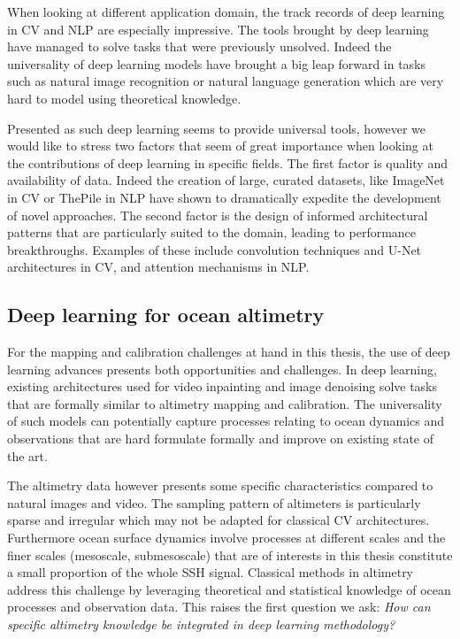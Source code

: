 \begin{bibunit}
When looking at different application domain, the track records of deep learning in CV\cite{chaiDeepLearningComputer2021} and NLP\cite{brownLanguageModelsAre2020} are especially impressive. 
The tools brought by deep learning have managed to solve tasks that were previously unsolved.
Indeed the universality of deep learning models have brought a big leap forward in tasks such as natural image recognition or natural language generation which are very hard to model using theoretical knowledge.

Presented as such deep learning seems to provide universal tools,  
however we would like to stress two factors that seem of great importance when looking at the contributions of deep learning in specific fields.
The first factor is quality and availability of data.
Indeed the creation of large, curated datasets, like ImageNet\cite{dengImageNetLargescaleHierarchical2009} in CV or ThePile\cite{gaoPile800GBDataset2020} in NLP have shown to dramatically expedite the development of novel approaches. 
The second factor is the design of informed architectural patterns that are particularly suited to the domain, leading to performance breakthroughs.
Examples of these include convolution techniques\cite{lecunHandwrittenDigitRecognition1989} and U-Net architectures\cite{ronnebergerUNetConvolutionalNetworks2015} in CV, and attention mechanisms\cite{vaswaniAttentionAllYou} in NLP.


\subsection*{Deep learning for ocean altimetry}
For the mapping and calibration challenges at hand in this thesis, the use of deep learning advances presents both opportunities and challenges.
In deep learning, existing architectures used for video inpainting\cite{kimDeepVideoInpainting} and image denoising\cite{tianDeepLearningImage2020} solve tasks that are formally similar to altimetry mapping and calibration.
The universality of such models can potentially capture processes relating to ocean dynamics and observations that are hard formulate formally and improve on existing state of the art.

The altimetry data however presents some specific characteristics compared to natural images and video.
The sampling pattern of altimeters is particularly sparse and irregular which may not be adapted for classical CV architectures.
Furthermore ocean surface dynamics involve processes at different scales and the finer scales (mesoscale, submesoscale) that are of interests in this thesis constitute a small proportion of the whole SSH signal.
Classical methods in altimetry address this challenge by leveraging theoretical and statistical knowledge of ocean processes and observation data.
This raises the first question we ask: \textit{How can specific altimetry knowledge be integrated in deep learning methodology?}


\end{bibunit}
